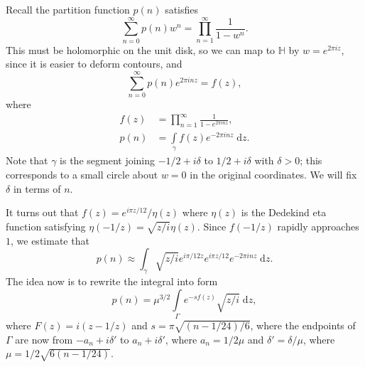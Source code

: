 \documentclass[11pt,
        usenames, %
        dvipsnames %
    ]{report}
\begin{document}
\begin{itemize}
        Recall the partition function $p(n)$ satisfies
        \begin{equation}
            \sum\limits_{n = 0}^\infty p(n) w^n = \prod\limits_{n = 1}^\infty
                \frac{1}{1 - w^n}.
        \end{equation}
        This must be holomorphic on the unit disk, so we can map to $\mathbb{H}$
        by $w = e^{2\pi i z}$, since it is easier to deform contours, and
        \begin{equation}
            \sum\limits_{n = 0}^\infty p(n) e^{2\pi inz} = f(z),
        \end{equation}
        where
        \begin{align}
            f(z) &= \prod_{n = 1}^\infty \frac{1}{1 - e^{2\pi i nz}},\\
            p(n) &= \int\limits_\gamma f(z) e^{-2\pi i nz}\;\mathrm{d}z.
        \end{align}
        Note that $\gamma$ is the segment joining $-1/2 + i\delta$ to $1/2 +
        i\delta$ with $\delta > 0$; this corresponds to a small circle about $w
        = 0$ in the original coordinates. We will fix $\delta$ in terms of $n$.

        It turns out that $f(z) = e^{i\pi z / 12} / \eta(z)$ where $\eta(z)$ is
        the Dedekind eta function satisfying $\eta(-1/z) = \sqrt{z / i}\eta(z)$.
        Since $f(-1/z)$ rapidly approaches $1$, we estimate that
        \begin{equation}
            p(n) \approx \int_\gamma \sqrt{z/i}e^{i\pi / 12z}e^{i\pi z / 12}
                e^{-2\pi inz}\;\mathrm{d}z.
        \end{equation}
        The idea now is to rewrite the integral into form
        \begin{equation}
            p(n) = \mu^{3/2}\int\limits_\Gamma
                e^{-sf(z)}\sqrt{z / i}\;\mathrm{d}z,
        \end{equation}
        where $F(z) = i(z - 1/z)$ and $s = \pi \sqrt{(n - 1/24) / 6}$, where the
        endpoints of $\Gamma$ are now from $-a_n + i\delta'$ to $a_n +
        i\delta'$, where $a_n = 1/2\mu$ and $\delta' = \delta / \mu$, where $\mu
        = 1 / 2\sqrt{6(n - 1/24)}$.


\end{itemize}
\end{document}
